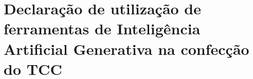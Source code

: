 
\newcommand{\caixa}{$\square$}      %
\newcommand{\marcada}{$\boxtimes$}  %
\newcommand{\linhaia}[4]{#1 & #2\newline\textit{Exemplos: #3} & #4 \\ \hline}
\newcommand{\blocoia}[1]{\hline\multicolumn{3}{|c|}{\textbf{#1}} \\ \hline}

\newcommand{\trechosia}{%
  Seções~\ref{autosec:1.1} (p.~\pageref{autosec:1.1}),
  \ref{autosec:1.4} (p.~\pageref{autosec:1.4}),
  \ref{autosec:3.3} (p.~\pageref{autosec:3.3}),
  \ref{autosec:6.1} (p.~\pageref{autosec:6.1}) e
  \ref{autosec:6.3} (p.~\pageref{autosec:6.3});
  Capítulo~2 inteiro (p.~\pageref{autochap:2}--\the\numexpr\getpagerefnumber{autochap:3}-1\relax);
  Capítulo~5 inteiro (p.~\pageref{autochap:5}--\the\numexpr\getpagerefnumber{autochap:6}-1\relax).}

\chapter*{Declaração de utilização de ferramentas de Inteligência Artificial Generativa na confecção do TCC}
\thispagestyle{empty}
\pagestyle{empty}

